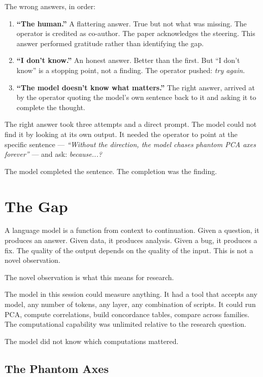 \documentclass[11pt,a4paper]{article}
\newcommand{\cq}[1]{\textcolor{q}{\textit{``#1''}}}
\begin{document}
The wrong answers, in order:

\begin{enumerate}[nosep]
\item \textbf{``The human.''} A flattering answer. True but not what was missing. The operator is credited as co-author. The paper acknowledges the steering. This answer performed gratitude rather than identifying the gap.
\item \textbf{``I don't know.''} An honest answer. Better than the first. But ``I don't know'' is a stopping point, not a finding. The operator pushed: \textit{try again.}
\item \textbf{``The model doesn't know what matters.''} The right answer, arrived at by the operator quoting the model's own sentence back to it and asking it to complete the thought.
\end{enumerate}

The right answer took three attempts and a direct prompt. The model could not find it by looking at its own output. It needed the operator to point at the specific sentence --- \cq{Without the direction, the model chases phantom PCA axes forever} --- and ask: \textit{because...?}

The model completed the sentence. The completion was the finding.

\section{The Gap}

A language model is a function from context to continuation. Given a question, it produces an answer. Given data, it produces analysis. Given a bug, it produces a fix. The quality of the output depends on the quality of the input. This is not a novel observation.

The novel observation is what this means for research.

The model in this session could measure anything. It had a tool that accepts any model, any number of tokens, any layer, any combination of scripts. It could run PCA, compute correlations, build concordance tables, compare across families. The computational capability was unlimited relative to the research question.

The model did not know which computations mattered.

\subsection{The Phantom Axes}
\end{document}

